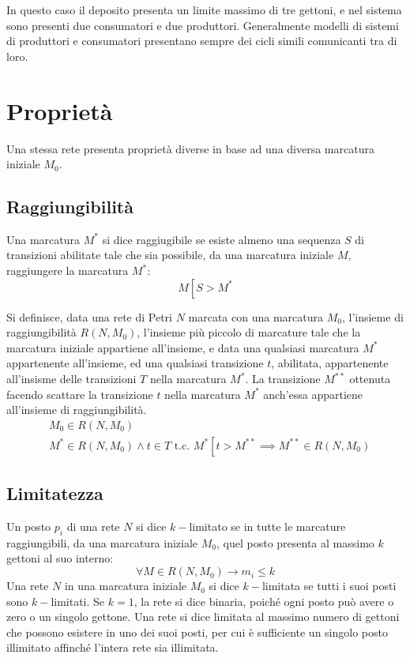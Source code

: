 \documentclass{article}
\numberwithin{equation}{subsection}
\begin{document}
In questo caso il deposito presenta un limite massimo di tre gettoni, e nel sistema sono presenti due consumatori e due produttori. Generalmente modelli di sistemi di produttori 
e consumatori presentano sempre dei cicli simili comunicanti tra di loro. 

\clearpage

\section{Proprietà}

Una stessa rete presenta proprietà diverse in base ad una diversa marcatura iniziale $M_0$. 

\subsection{Raggiungibilità}
Una marcatura $M^*$ si dice raggiugibile se esiste almeno una sequenza $S$ di transizioni abilitate tale che sia possibile, da una marcatura iniziale $M$, raggiungere la 
marcatura $M^*$:
\begin{equation*}
    M\left[S>M^*\right.
\end{equation*}


Si definisce, data una rete di Petri $N$ marcata con una marcatura $M_0$, l'insieme di raggiungibilità $R(N,M_0)$, l'insieme più piccolo di marcature tale che la marcatura 
iniziale appartiene all'insieme, e data una qualsiasi marcatura $M^*$ appartenente all'insieme, ed una qualsiasi transizione $t$, abilitata, appartenente all'insisme delle transizioni 
$T$ nella marcatura $M^*$. La transizione $M^{**}$ ottenuta facendo scattare la transizione $t$ nella marcatura $M^*$ anch'essa appartiene all'insieme di raggiungibilità. 
\begin{align*}
    &M_0\in R(N,M_0)\\
    &M^*\in R(N,M_0)\land t\in T\mbox{ t.c. } M^*\left[\right.t>M^{**}\implies M^{**}\in R(N,M_0)
\end{align*}

\subsection{Limitatezza}

Un posto $p_i$ di una rete $N$ si dice $k-$limitato se in tutte le marcature raggiungibili, da una marcatura iniziale $M_0$, quel posto presenta al massimo $k$ gettoni al 
suo interno:
\begin{equation*}
    \forall M\in R(N,M_0)\to m_i\leq k
\end{equation*} 
Una rete $N$ in una marcatura iniziale $M_0$ si dice $k-$limitata se tutti i suoi posti sono $k-$limitati. Se $k=1$, la rete si dice binaria, poiché ogni 
posto può avere o zero o un singolo gettone. Una rete si dice limitata al massimo numero di gettoni che possono esistere in uno dei suoi posti, per cui è sufficiente un 
singolo posto illimitato affinché l'intera rete sia illimitata. 
\end{document}
